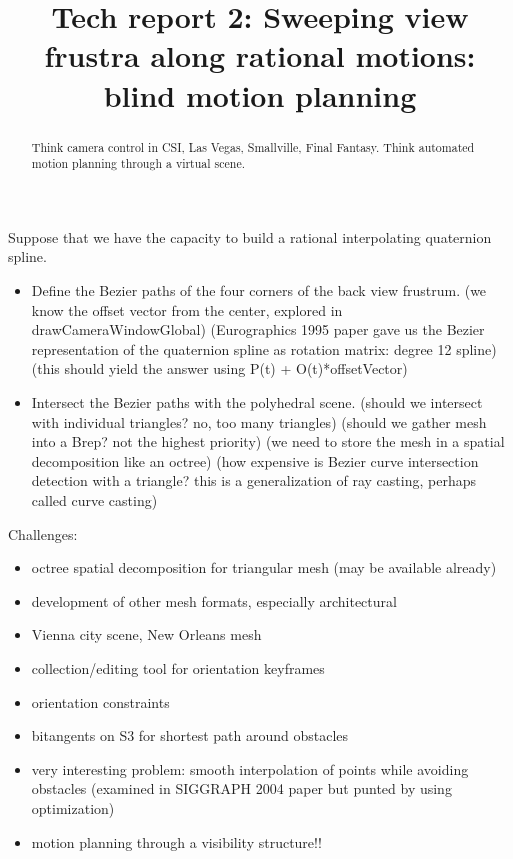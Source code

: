 \documentclass[12pt]{article}
\title{Tech report 2: Sweeping view frustra along rational motions: blind motion planning}
\begin{document}
\maketitle

\begin{abstract}
Think camera control in CSI, Las Vegas, Smallville, Final Fantasy.
Think automated motion planning through a virtual scene.
\end{abstract}

Suppose that we have the capacity to build a rational interpolating quaternion spline.
\begin{itemize}
\item Define the Bezier paths of the four corners of the back view frustrum.
      (we know the offset vector from the center, explored in drawCameraWindowGlobal)
      (Eurographics 1995 paper gave us the Bezier representation of the quaternion spline
       as rotation matrix: degree 12 spline)
      (this should yield the answer using P(t) + O(t)*offsetVector)
\item Intersect the Bezier paths with the polyhedral scene.
      (should we intersect with individual triangles? no, too many triangles)
      (should we gather mesh into a Brep? not the highest priority)
      (we need to store the mesh in a spatial decomposition like an octree)
      (how expensive is Bezier curve intersection detection with a triangle? this is
       a generalization of ray casting, perhaps called curve casting)
\end{itemize}

Challenges: 
\begin{itemize}
\item octree spatial decomposition for triangular mesh (may be available already)
\item development of other mesh formats, especially architectural
\item Vienna city scene, New Orleans mesh
\item collection/editing tool for orientation keyframes
\item orientation constraints
\item bitangents on S3 for shortest path around obstacles
\item very interesting problem: smooth interpolation of points while avoiding obstacles
      (examined in SIGGRAPH 2004 paper but punted by using optimization)
\item motion planning through a visibility structure!!
\end{itemize}
\end{document}
